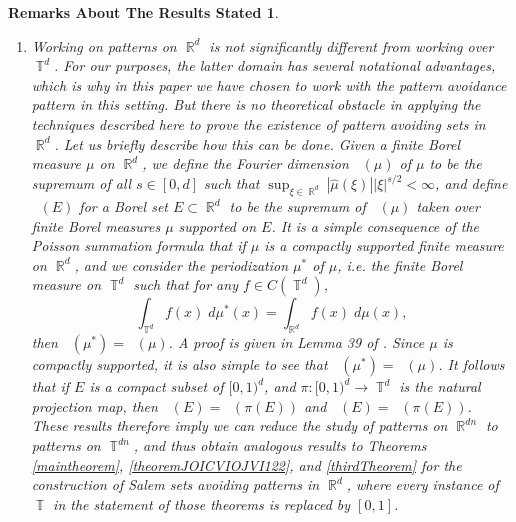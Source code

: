 \documentclass[dvipsnames,letterpaper,12pt]{article}
\numberwithin{equation}{section}
\DeclareMathOperator{\hausdim}{\dim_{\mathbb{H}}}
\DeclareMathOperator{\fordim}{\dim_{\mathbb{F}}}
\DeclareMathOperator{\RR}{\mathbb{R}}
\DeclareMathOperator{\TT}{\mathbb{T}}
\newtheorem*{remarksaboutresults}{Remarks About The Results Stated}
\numberwithin{theorem}{section}
\begin{document}
\begin{remarksaboutresults}
\begin{enumerate}
        \item Working on patterns on $\RR^d$ is not significantly different from working over $\TT^d$. For our purposes, the latter domain has several notational advantages, which is why in this paper we have chosen to work with the pattern avoidance pattern in this setting. But there is no theoretical obstacle in applying the techniques described here to prove the existence of pattern avoiding sets in $\RR^d$. Let us briefly describe how this can be done. Given a finite Borel measure $\mu$ on $\RR^d$, we define the Fourier dimension $\fordim(\mu)$ of $\mu$ to be the supremum of all $s \in [0,d]$ such that $\sup_{\xi \in \RR^d} |\widehat{\mu}(\xi)| |\xi|^{s/2} < \infty$, and define $\fordim(E)$ for a Borel set $E \subset \RR^d$ to be the supremum of $\fordim(\mu)$ taken over finite Borel measures $\mu$ supported on $E$. It is a simple consequence of the Poisson summation formula that if $\mu$ is a compactly supported finite measure on $\RR^d$, and we consider the \emph{periodization} $\mu^*$ of $\mu$, i.e. the finite Borel measure on $\TT^d$ such that for any $f \in C(\TT^d)$,
    \begin{equation}
        \int_{\TT^d} f(x)\; d\mu^*(x) = \int_{\RR^d} f(x)\; d\mu(x),
    \end{equation}
    then $\fordim(\mu^*) = \fordim(\mu)$. A proof is given in Lemma 39 of \cite{MyThesis}. Since $\mu$ is compactly supported, it is also simple to see that $\hausdim(\mu^*) = \hausdim(\mu)$. It follows that if $E$ is a compact subset of $[0,1)^d$, and $\pi: [0,1)^d \to \TT^d$ is the natural projection map, then $\fordim(E) = \fordim(\pi(E))$ and $\hausdim(E) = \hausdim(\pi(E))$. These results therefore imply we can reduce the study of patterns on $\RR^{dn}$ to patterns on $\TT^{dn}$, and thus obtain analogous results to Theorems \ref{maintheorem}, \ref{theoremJOICVIOJVI122}, and \ref{thirdTheorem} for the construction of Salem sets avoiding patterns in $\RR^d$, where every instance of $\TT$ in the statement of those theorems is replaced by $[0,1]$.
    \end{enumerate}
\end{remarksaboutresults}

\end{document}
